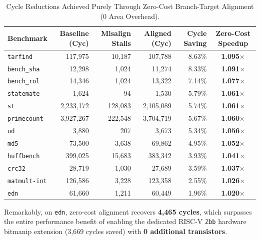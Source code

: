 \documentclass[11pt,a4paper]{article}
\begin{document}
\begin{table}[h!]
\centering
\small
\begin{tabular}{l r r r r c}
\toprule
\textbf{Benchmark} & \textbf{Baseline (Cyc)} & \textbf{Misalign Stalls} & \textbf{Aligned (Cyc)} & \textbf{Cycle Saving} & \textbf{Zero-Cost Speedup} \\
\midrule
\texttt{tarfind}      & 117,975   & 10,187  & 107,788   & 8.63\%  & \textbf{1.095$\times$} \\
\texttt{bench\_sha}   & 12,298    & 1,024   & 11,274    & 8.33\%  & \textbf{1.091$\times$} \\
\texttt{bench\_rol}   & 14,346    & 1,024   & 13,322    & 7.14\%  & \textbf{1.077$\times$} \\
\texttt{statemate}    & 1,624     & 94      & 1,530     & 5.79\%  & \textbf{1.061$\times$} \\
\texttt{st}           & 2,233,172 & 128,083 & 2,105,089 & 5.74\%  & \textbf{1.061$\times$} \\
\texttt{primecount}   & 3,927,267 & 222,548 & 3,704,719 & 5.67\%  & \textbf{1.060$\times$} \\
\texttt{ud}           & 3,880     & 207     & 3,673     & 5.34\%  & \textbf{1.056$\times$} \\
\texttt{md5}          & 73,500    & 3,638   & 69,862    & 4.95\%  & \textbf{1.052$\times$} \\
\texttt{huffbench}    & 399,025   & 15,683  & 383,342   & 3.93\%  & \textbf{1.041$\times$} \\
\texttt{crc32}        & 28,719    & 1,030   & 27,689    & 3.59\%  & \textbf{1.037$\times$} \\
\texttt{matmult-int}  & 126,586   & 3,228   & 123,358   & 2.55\%  & \textbf{1.026$\times$} \\
\texttt{edn}          & 61,660    & 1,211   & 60,449    & 1.96\%  & \textbf{1.020$\times$} \\
\bottomrule
\end{tabular}
\caption{Cycle Reductions Achieved Purely Through Zero-Cost Branch-Target Alignment (0 Area Overhead).}
\label{tab:alignment_results}
\end{table}

Remarkably, on \texttt{edn}, zero-cost alignment recovers \textbf{4,465 cycles}, which surpasses the entire performance benefit of enabling the dedicated RISC-V \texttt{Zbb} hardware bitmanip extension (3,669 cycles saved) with \textbf{0 additional transistors}.

\clearpage
\end{document}
